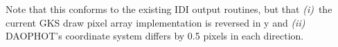 \vspace{10mm}

Note that this conforms to the existing IDI output routines, but that  {\em
(i)}\/~the current GKS draw pixel array implementation is reversed in y and
{\em (ii)}\/~ DAOPHOT's coordinate system differs by 0.5 pixels in each
direction.


                                                                                                                                                                        